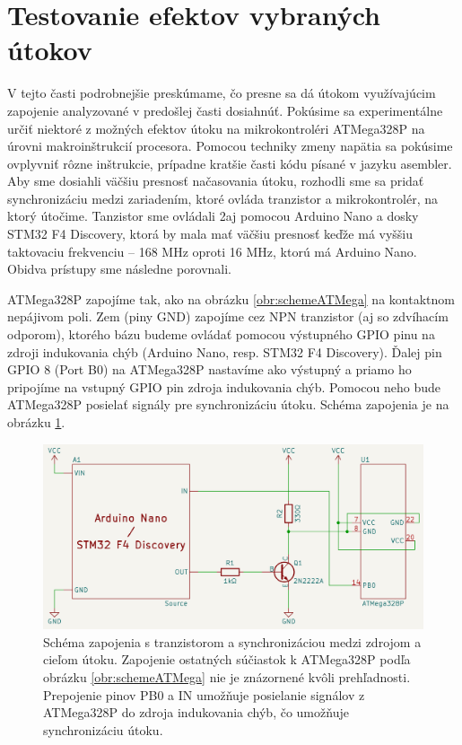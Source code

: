 \section{Testovanie efektov vybraných útokov}
V tejto časti podrobnejšie preskúmame, čo presne sa dá útokom využívajúcim zapojenie analyzované v predošlej časti dosiahnúť. Pokúsime sa experimentálne určiť niektoré z možných efektov útoku na mikrokontroléri ATMega328P na úrovni makroinštrukcií procesora. Pomocou techniky zmeny napätia sa pokúsime ovplyvniť rôzne inštrukcie, prípadne kratšie časti kódu písané v jazyku asembler. Aby sme dosiahli väčšiu presnosť načasovania útoku, rozhodli sme sa pridať synchronizáciu medzi zariadením, ktoré ovláda tranzistor a mikrokontrolér, na ktorý útočime. Tanzistor sme ovládali 2aj pomocou Arduino Nano a dosky STM32 F4 Discovery, ktorá by mala mať väčšiu presnosť keďže má vyššiu taktovaciu frekvenciu -- 168 MHz oproti 16 MHz, ktorú má Arduino Nano. Obidva prístupy sme následne porovnali.

ATMega328P zapojíme tak, ako na obrázku \ref{obr:schemeATMega} na kontaktnom nepájivom poli. Zem (piny GND) zapojíme cez NPN tranzistor (aj so zdvíhacím odporom), ktorého bázu budeme ovládať pomocou výstupného GPIO pinu na zdroji indukovania chýb (Arduino Nano, resp. STM32 F4 Discovery). Ďalej pin GPIO 8 (Port B0) na ATMega328P nastavíme ako výstupný a priamo ho pripojíme na vstupný GPIO pin zdroja indukovania chýb. Pomocou neho bude ATMega328P posielať signály pre synchronizáciu útoku. Schéma zapojenia je na obrázku \ref{obr:schemeExpTranz}.

\begin{figure}
    \centerline{\includegraphics[width=1\textwidth]{images/schemeExpTranz.png}}
    \caption[Schéma zapojenia s tranzistorom a synchronizáciou]{Schéma zapojenia s tranzistorom a synchronizáciou medzi zdrojom a cieľom útoku. Zapojenie ostatných súčiastok k ATMega328P podľa obrázku \ref{obr:schemeATMega} nie je znázornené kvôli prehľadnosti. Prepojenie pinov PB0 a IN umožňuje posielanie signálov z ATMega328P do zdroja indukovania chýb, čo umožňuje synchronizáciu útoku.}
    \label{obr:schemeExpTranz}
\end{figure}

